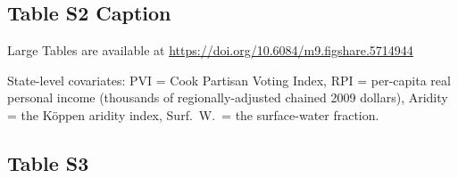 \documentclass[draft]{agujournal}\usepackage{knitr}
\begin{document}
\subsection*{Table S2 Caption}
\begin{table}[H]
\centering
Large Tables are available at \url{https://doi.org/10.6084/m9.figshare.5714944}
\caption{State-level covariates: PVI = Cook Partisan Voting Index, RPI = per-capita real personal income (thousands of regionally-adjusted chained 2009 dollars), Aridity = the K\"oppen aridity index, Surf.\ W.\ = the surface-water fraction.}
\label{tab:state}
\end{table}



\subsection*{Table S3}
\end{document}
